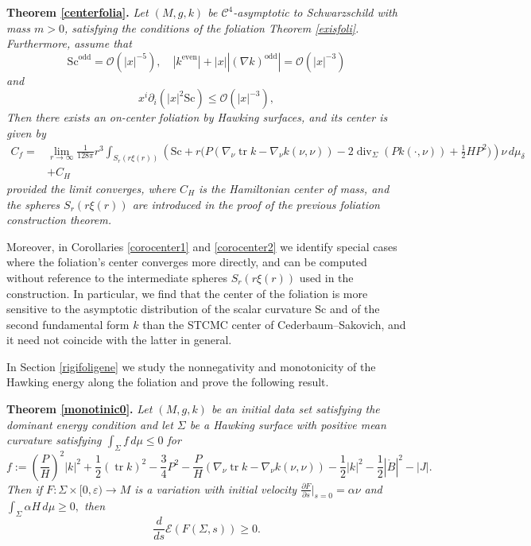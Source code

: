 \documentclass[12pt,a4paper]{amsart}
\theoremstyle{plain}
\theoremstyle{definition}
\newcommand{\diver}{\operatorname{div}}
\newcommand{\tr}{\operatorname{tr}}
\begin{document}
\noindent\textbf{Theorem \ref{centerfolia}.} \emph{Let $(M,g,k)$ be $ \mathcal{C}^4$-asymptotic to Schwarzschild with mass $m>0$, satisfying the conditions of the foliation  Theorem \ref{exisfoli}.  Furthermore, assume that 
   \begin{equation*}
   \mathrm{Sc}^{\text{odd}} =\mathcal{O} ( |x|^{-5}), \quad  |k^{\text{even}}| + |x||(\nabla k)^{\text{odd}}| = \mathcal{O} (|x|^{-3})
\end{equation*}
and 
\begin{equation*}
    x^i \partial_i (|x|^2 \mathrm{Sc}) \leq \mathcal{O}( |x|^{-3}),
\end{equation*}
Then there exists an on-center foliation by Hawking surfaces, and its center is given by 
\begin{equation*}\begin{split}
    C_{f}=&  \lim_{r \to \infty}\frac{1}{128 \pi} r^3 \int_{S_r(r \xi(r))} \left( \mathrm{Sc} +r \Big( P( \nabla_\nu \tr k - \nabla_\nu k(\nu,\nu )) - 2 \diver_\Sigma (P k(\cdot, \nu))  +\frac{1}{2}H P^2 \Big)\right) \nu \, d\mu_{\delta}\\
    &+ C_H
    \end{split}
\end{equation*}
provided the limit converges, where $C_H$ is the Hamiltonian center of mass, and the spheres $S_r(r \xi(r))$ are introduced in the proof of the previous foliation construction theorem.} 

Moreover, in Corollaries \ref{corocenter1} and \ref{corocenter2} we identify special cases where the foliation’s center converges more directly, and can be computed without reference to the intermediate spheres $S_r(r \xi(r))$ used in the construction. In particular, we find that the center of the  foliation is more sensitive to the asymptotic distribution of the scalar curvature \(\mathrm{Sc}\) and of the second fundamental form \(k\) than the STCMC center of Cederbaum–Sakovich, and it need not coincide with the latter in general.



In Section \ref{rigifoligene} we study the nonnegativity and monotonicity of the Hawking energy along the foliation and prove the following  result.

\noindent\textbf{Theorem \ref{monotinic0}.} \emph{Let $(M,g,k)$ be an initial data set  satisfying the dominant energy condition and let \( \Sigma \) be a Hawking surface with positive mean curvature satisfying  $\int_\Sigma f \, d\mu \leq 0$ for
    \begin{equation*}
        f:= \left( \frac{P}{H}\right)^2|k|^2+ \frac{1}{2 }(\tr k)^2    - \frac{3}{4} P^2- \frac{P}{H}( \nabla_\nu \tr k - \nabla_\nu k(\nu,\nu )) -  \frac{1}{2} |k|^2  -\frac{1}{2} |\mathring{B}|^2 -|J|.
    \end{equation*}
     Then if \( F : \Sigma \times [0, \varepsilon) \rightarrow M \) is a variation with initial velocity \( \frac{\partial F}{\partial s} \Big|_{s=0} = \alpha \nu \) and $\int_{\Sigma} \alpha H \, d\mu \geq 0,$ then 
\[
\frac{d}{ds} \mathcal{E}(F(\Sigma, s)) \geq 0.
\]}
\end{document}
